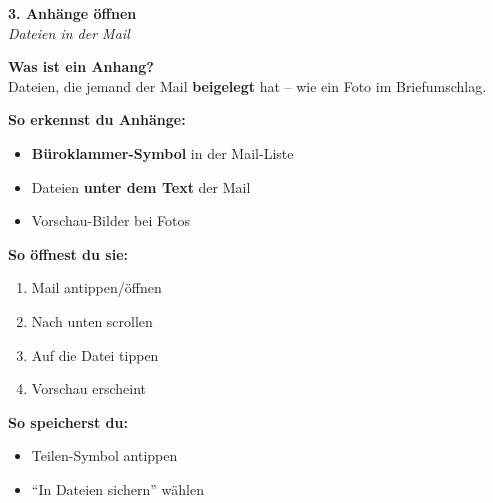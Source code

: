 \documentclass[a4paper,landscape,8pt]{extarticle}
\begin{document}
\begin{minipage}[t]{0.32\linewidth}
\begin{center}
\colorbox{attachorange!10}{%
\begin{minipage}{0.95\linewidth}
\vspace{2mm}
\begin{center}
{\Large\bfseries\textcolor{attachorange}{3. Anhänge öffnen}}\\[1pt]
{\footnotesize\itshape Dateien in der Mail}
\end{center}
\vspace{2mm}
\end{minipage}%
}
\end{center}

\vspace{1mm}

\textbf{Was ist ein Anhang?}\\
Dateien, die jemand der Mail \textbf{beigelegt} hat -- wie ein Foto im Briefumschlag.

\textbf{So erkennst du Anhänge:}
\begin{itemize}
\item \textbf{Büroklammer-Symbol} in der Mail-Liste
\item Dateien \textbf{unter dem Text} der Mail
\item Vorschau-Bilder bei Fotos
\end{itemize}

\textbf{So öffnest du sie:}
\begin{enumerate}
\item Mail antippen/öffnen
\item Nach unten scrollen
\item Auf die Datei tippen
\item Vorschau erscheint
\end{enumerate}

\textbf{So speicherst du:}
\begin{itemize}
\item Teilen-Symbol antippen
\item ``In Dateien sichern'' wählen
\end{itemize}

\vspace{2mm}

\end{minipage}
\end{document}
